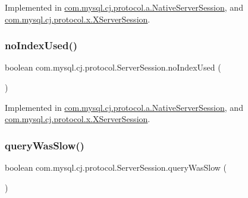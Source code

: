 Implemented in \mbox{\hyperlink{classcom_1_1mysql_1_1cj_1_1protocol_1_1a_1_1_native_server_session_ad51925b4903a656610eed30bfaa51562}{com.\+mysql.\+cj.\+protocol.\+a.\+Native\+Server\+Session}}, and \mbox{\hyperlink{classcom_1_1mysql_1_1cj_1_1protocol_1_1x_1_1_x_server_session_afb2168187353b13226a76ba9bf659a50}{com.\+mysql.\+cj.\+protocol.\+x.\+X\+Server\+Session}}.

\mbox{\label{interfacecom_1_1mysql_1_1cj_1_1protocol_1_1_server_session_a94f56669636895e83594c8f0fc89817a}} 
\subsubsection{\texorpdfstring{no\+Index\+Used()}{noIndexUsed()}}
{\footnotesize\ttfamily boolean com.\+mysql.\+cj.\+protocol.\+Server\+Session.\+no\+Index\+Used (\begin{DoxyParamCaption}{ }\end{DoxyParamCaption})}



Implemented in \mbox{\hyperlink{classcom_1_1mysql_1_1cj_1_1protocol_1_1a_1_1_native_server_session_aca343c9466cb45a783268924ce14b277}{com.\+mysql.\+cj.\+protocol.\+a.\+Native\+Server\+Session}}, and \mbox{\hyperlink{classcom_1_1mysql_1_1cj_1_1protocol_1_1x_1_1_x_server_session_ad2c0134175f2583dba2948b4c6e79f7e}{com.\+mysql.\+cj.\+protocol.\+x.\+X\+Server\+Session}}.

\mbox{\label{interfacecom_1_1mysql_1_1cj_1_1protocol_1_1_server_session_a120504f00410f183697ee1c5d3dbeddc}} 
\subsubsection{\texorpdfstring{query\+Was\+Slow()}{queryWasSlow()}}
{\footnotesize\ttfamily boolean com.\+mysql.\+cj.\+protocol.\+Server\+Session.\+query\+Was\+Slow (\begin{DoxyParamCaption}{ }\end{DoxyParamCaption})}




